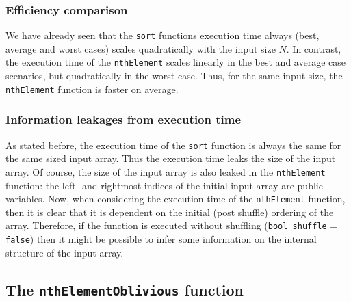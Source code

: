 \documentclass[11pt]{article}
\newcommand{\ct}[1]{\texttt{#1}}
\begin{document}

\subsubsection{Efficiency comparison} %
\label{ssub:efficiency_comparison}


We have already seen that the \ct{sort} functions execution time always (best, average and worst cases) scales quadratically with the input size $N$. In contrast, the execution time of the \ct{nthElement} scales linearly in the best and average case scenarios, but quadratically in the worst case. Thus, for the same input size, the \ct{nthElement} function is faster on average.     


\subsubsection{Information leakages from execution time} %
\label{ssub:information_leakages_from_execution_time}

As stated before, the execution time of the \ct{sort} function is always the same for the same sized input array. Thus the execution time leaks the size of the input array. Of course, the size of the input array is also leaked in the \ct{nthElement} function: the left- and rightmost indices of the initial input array are public variables. Now, when considering the execution time of the \ct{nthElement} function, then it is clear that it is dependent on the initial (post shuffle) ordering of the array. Therefore, if the function is executed without shuffling (\ct{bool shuffle} = \ct{false}) then it might be possible to infer some information on the internal structure of the input array.      



\subsection{The \ct{nthElementOblivious} function} %
\label{sub:the_nthelementoblivious_function}
\end{document}
